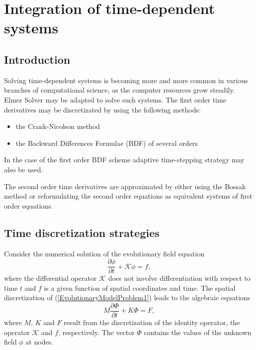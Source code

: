 \newcommand{\ExampleOperator}{\mathcal{K}}

\chapter{Integration of time-dependent systems}
\noindent

\section{Introduction}

Solving time-dependent systems is becoming more and more common 
in various branches of computational science,
as the computer resources grow steadily.
Elmer Solver may be adapted to solve such systems. The first order time 
derivatives may be discretizated by using the following methods:
\begin{itemize}
\item the Crank-Nicolson method
\item the Backward Differences Formulae (BDF) of several orders
\end{itemize}
In the case of the first order BDF scheme adaptive time-stepping strategy may also
be used. 

The second order time derivatives are approximated by either using the Bossak 
method or reformulating the second order equations as equivalent systems
of first order equations. 


\section{Time discretization strategies}

Consider the numerical solution of the evolutionary field equation 
\begin{equation}\label{EvolutionaryModelProblem1}
\frac{\partial \phi}{\partial t} %
+\ExampleOperator\phi = f,
\end{equation}
where the differential operator $\ExampleOperator$ does not involve 
differentiation with respect to time $t$ and $f$ is a given function of spatial 
coordinates and time. The spatial discretization of (\ref{EvolutionaryModelProblem1}) 
leads to the algebraic equations 
\begin{equation}\label{EqToTimeDiscretizate}
M\frac{\partial \Phi}{\partial t} + K\Phi = F,
\end{equation}
where $M$, $K$ and $F$ result from the discretization of the identity operator,
the operator $\ExampleOperator$ and $f$, respectively. 
The vector $\Phi$ contains the values of the unknown field $\phi$ at nodes.  


